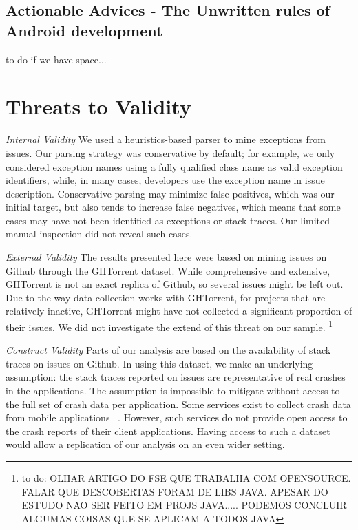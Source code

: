 \documentclass[conference]{IEEEtran}
\begin{document}
\subsection{Actionable Advices - The Unwritten rules of Android development}
to do if we have space...


\section{Threats to Validity}
\label{sec:threats}

\noindent\emph{Internal Validity} We used a heuristics-based parser to mine
exceptions from issues.  Our parsing strategy was conservative by default; for
example, we only considered exception names using a fully qualified class name
as valid exception identifiers, while, in many cases, developers use the
exception name in issue description. Conservative parsing may minimize false
positives, which was our initial target, but also tends to increase false
negatives, which means that some cases may have not been identified as
exceptions or stack traces. Our limited manual inspection did not reveal such
cases.

\noindent\emph{External Validity} The results presented here were based on mining
issues on Github through the GHTorrent dataset. While comprehensive and
extensive, GHTorrent is not an exact replica of Github, so several issues might
be left out. Due to the way data collection works with GHTorrent, for projects
that are relatively inactive, GHTorrent might have not collected a significant
proportion of their issues. We did not investigate the extend of this threat on
our sample.
\footnote{to do: OLHAR ARTIGO DO FSE QUE TRABALHA COM OPENSOURCE.
FALAR QUE DESCOBERTAS FORAM DE LIBS JAVA. APESAR DO ESTUDO NAO SER FEITO EM PROJS JAVA.....
PODEMOS CONCLUIR ALGUMAS COISAS QUE SE APLICAM A TODOS JAVA}

\noindent\emph{Construct Validity} Parts of our analysis are based on the availability of stack traces on issues on
Github. In using this dataset, we make an underlying assumption: the
stack traces reported on issues are representative of real crashes in
the applications. The assumption is impossible to mitigate without access to
the full set of crash data per application. Some services exist to collect 
crash data from mobile applications ~\cite{BugSe14,BugSn14,Googl14,Acra14}.
However, such services do not provide open access to the crash reports
of their client applications. Having access to such a dataset would allow 
a replication of our analysis on an even wider setting.
\end{document}
